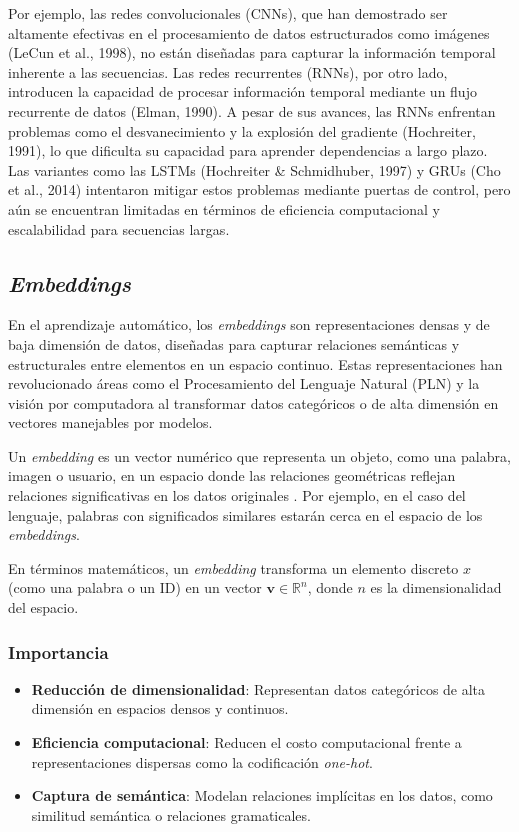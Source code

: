 Por ejemplo, las redes convolucionales (CNNs), que han demostrado ser altamente efectivas en el procesamiento de datos estructurados como imágenes (LeCun et al., 1998), no están diseñadas para capturar la información temporal inherente a las secuencias. Las redes recurrentes (RNNs), por otro lado, introducen la capacidad de procesar información temporal mediante un flujo recurrente de datos (Elman, 1990). A pesar de sus avances, las RNNs enfrentan problemas como el desvanecimiento y la explosión del gradiente (Hochreiter, 1991), lo que dificulta su capacidad para aprender dependencias a largo plazo. Las variantes como las LSTMs (Hochreiter \& Schmidhuber, 1997) y GRUs (Cho et al., 2014) intentaron mitigar estos problemas mediante puertas de control, pero aún se encuentran limitadas en términos de eficiencia computacional y escalabilidad para secuencias largas.

\subsection{\textit{Embeddings}}

En el aprendizaje automático, los \textit{embeddings} son representaciones densas y de baja dimensión de datos, diseñadas para capturar relaciones semánticas y estructurales entre elementos en un espacio continuo. Estas representaciones han revolucionado áreas como el Procesamiento del Lenguaje Natural (PLN) y la visión por computadora al transformar datos categóricos o de alta dimensión en vectores manejables por modelos.

Un \textit{embedding} es un vector numérico que representa un objeto, como una palabra, imagen o usuario, en un espacio donde las relaciones geométricas reflejan relaciones significativas en los datos originales \cite{bengio2000neural}. Por ejemplo, en el caso del lenguaje, palabras con significados similares estarán cerca en el espacio de los \textit{embeddings}.

En términos matemáticos, un \textit{embedding} transforma un elemento discreto $x$ (como una palabra o un ID) en un vector $\mathbf{v} \in \mathbb{R}^n$, donde $n$ es la dimensionalidad del espacio.

\subsubsection*{Importancia}

\begin{itemize}
    \item \textbf{Reducción de dimensionalidad}: Representan datos categóricos de alta dimensión en espacios densos y continuos.
    \item \textbf{Eficiencia computacional}: Reducen el costo computacional frente a representaciones dispersas como la codificación \textit{one-hot}.
    \item \textbf{Captura de semántica}: Modelan relaciones implícitas en los datos, como similitud semántica o relaciones gramaticales.
\end{itemize}

